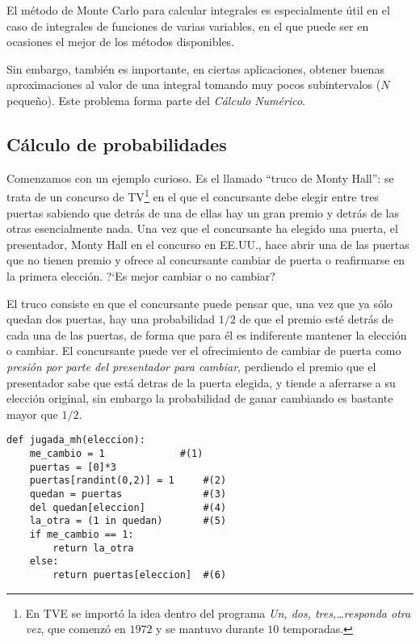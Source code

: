 \begin{enumerate}
El m\'etodo de Monte Carlo para calcular integrales es especialmente \'util en 
el caso de integrales de funciones de varias variables, en el que puede ser en 
ocasiones el mejor de los m\'etodos disponibles. 

\end{enumerate}


Sin embargo, tambi\'en es importante,  en ciertas aplicaciones, obtener buenas 
aproximaciones al valor de una integral tomando muy pocos subintervalos ($N$
peque\~no). Este problema forma parte del {\itshape
C\'alculo Num\'erico}.


\subsection {C\'alculo de probabilidades}
 
 Comenzamos con un ejemplo curioso. Es el llamado ``truco de Monty Hall'': se
trata de un concurso  de TV\footnote{En TVE se import\'o la idea dentro del 
programa {\itshape 
Un, dos, tres,\dots  responda otra vez}, que comenz\'o en $1972$ y se mantuvo 
durante $10$ temporadas.}
en el que el concursante debe elegir entre tres
puertas sabiendo que detr\'as de una de ellas hay un gran premio y detr\'as de
las otras esencialmente nada. Una vez que el concursante ha elegido una puerta,
el presentador, Monty Hall en el concurso en EE.UU., hace abrir una de las
puertas que no tienen premio y ofrece al concursante cambiar de puerta o
reafirmarse en la primera elecci\'on. ?`Es mejor cambiar o no cambiar?

El truco consiste en que el concursante puede pensar que, una vez que ya s\'olo
quedan dos puertas,  hay una probabilidad $1/2$ de que el premio est\'e detr\'as
de cada una de las puertas, de forma que para \'el es indiferente mantener la
elecci\'on o cambiar. El concursante puede ver el ofrecimiento de cambiar de
puerta como {\itshape presi\'on por parte del presentador para cambiar}, 
perdiendo el
premio que el presentador sabe que est\'a detras de la puerta elegida,  y tiende
a aferrarse a su elecci\'on original, sin embargo la probabilidad de ganar
cambiando es bastante mayor que $1/2$.
\newpage
 \begin{lstlisting}
def jugada_mh(eleccion):
    me_cambio = 1    		  #(1)      
    puertas = [0]*3
    puertas[randint(0,2)] = 1     #(2)    
    quedan = puertas              #(3) 
    del quedan[eleccion]          #(4)
    la_otra = (1 in quedan)       #(5)
    if me_cambio == 1:
        return la_otra  
    else:
        return puertas[eleccion]  #(6) 
\end{lstlisting}

